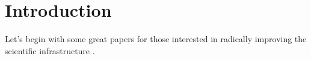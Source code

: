 \section{Introduction} \label{intro}
Let's begin with some great papers for those interested in radically improving the scientific infrastructure \citep{Pooley2021, Bezuidenhout2021,Brembs2021}.
\lipsum[1-2]
\lipsum[3-4]
